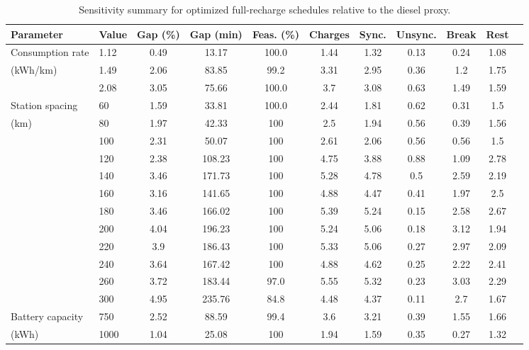 \documentclass[3p,11pt,authoryear]{elsarticle}  %
\begin{document}
\begin{table}[h!]
\centering
\caption{Sensitivity summary for optimized full-recharge schedules relative to the diesel proxy.}
\label{tab:sensitivity_full_diesel}
\begin{threeparttable}
\small
\setlength{\tabcolsep}{3.5pt}
\renewcommand{\arraystretch}{1.1}
\begin{tabular}{
ll
S[table-format=1.2]
S[table-format=3.0]
S[table-format=3.1]
S[table-format=1.2]
S[table-format=1.2]
S[table-format=1.2]
S[table-format=1.2]
S[table-format=1.2]
S[table-format=1.2]
}
\toprule
Parameter & Value & {Gap (\%)} & {Gap (min)} & {Feas. (\%)} & {Charges} & {Sync.} & {Unsync.} & {Break} & {Rest} \\
\midrule
Consumption rate & 1.12 & 0.49 & 13.17 & 100.0 & 1.44 & 1.32 & 0.13 & 0.24 & 1.08 \\
(kWh/km) & 1.49 & 2.06 & 83.85 & 99.2 & 3.31 & 2.95 & 0.36 & 1.2 & 1.75 \\
 & 2.08 & 3.05 & 75.66 & 100.0 & 3.7 & 3.08 & 0.63 & 1.49 & 1.59 \\
\addlinespace
Station spacing & 60 & 1.59 & 33.81 & 100.0 & 2.44 & 1.81 & 0.62 & 0.31 & 1.5 \\
(km) & 80 & 1.97 & 42.33 & 100 & 2.5 & 1.94 & 0.56 & 0.39 & 1.56 \\
 & 100 & 2.31 & 50.07 & 100 & 2.61 & 2.06 & 0.56 & 0.56 & 1.5 \\
 & 120 & 2.38 & 108.23 & 100 & 4.75 & 3.88 & 0.88 & 1.09 & 2.78 \\
 & 140 & 3.46 & 171.73 & 100 & 5.28 & 4.78 & 0.5 & 2.59 & 2.19 \\
 & 160 & 3.16 & 141.65 & 100 & 4.88 & 4.47 & 0.41 & 1.97 & 2.5 \\
 & 180 & 3.46 & 166.02 & 100 & 5.39 & 5.24 & 0.15 & 2.58 & 2.67 \\
 & 200 & 4.04 & 196.23 & 100 & 5.24 & 5.06 & 0.18 & 3.12 & 1.94 \\
 & 220 & 3.9 & 186.43 & 100 & 5.33 & 5.06 & 0.27 & 2.97 & 2.09 \\
 & 240 & 3.64 & 167.42 & 100 & 4.88 & 4.62 & 0.25 & 2.22 & 2.41 \\
 & 260 & 3.72 & 183.44 & 97.0 & 5.55 & 5.32 & 0.23 & 3.03 & 2.29 \\
 & 300 & 4.95 & 235.76 & 84.8 & 4.48 & 4.37 & 0.11 & 2.7 & 1.67 \\
\addlinespace
Battery capacity & 750 & 2.52 & 88.59 & 99.4 & 3.6 & 3.21 & 0.39 & 1.55 & 1.66 \\
(kWh) & 1000 & 1.04 & 25.08 & 100 & 1.94 & 1.59 & 0.35 & 0.27 & 1.32 \\

\end{tabular}
\end{threeparttable}
\end{table}
\end{document}
